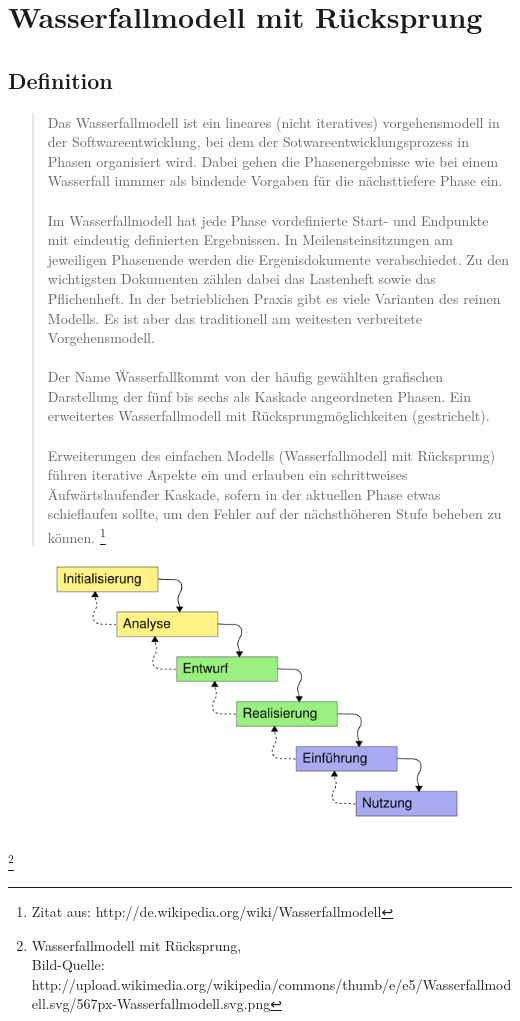 \chapter{Wasserfallmodell mit Rücksprung}
\section{Definition}
\begin{quote}
Das Wasserfallmodell ist ein lineares (nicht iteratives) vorgehensmodell in der Softwareentwicklung, bei dem der
 Sotwareentwicklungsprozess in Phasen organisiert wird. Dabei gehen die Phasenergebnisse wie bei einem Wasserfall immmer
als bindende Vorgaben für die nächsttiefere Phase ein.\ \\ \\
Im Wasserfallmodell hat jede Phase vordefinierte Start- und Endpunkte mit eindeutig definierten Ergebnissen.
In Meilensteinsitzungen am jeweiligen Phasenende werden die Ergenisdokumente verabschiedet. Zu den wichtigsten
Dokumenten zählen dabei das Lastenheft sowie das Pflichenheft. In der betrieblichen Praxis gibt es viele Varianten
des reinen Modells. Es ist aber das traditionell am weitesten verbreitete Vorgehensmodell.\ \\ \\
Der Name \"Wasserfall\" kommt von der häufig gewählten grafischen Darstellung der fünf bis sechs als Kaskade
angeordneten Phasen. Ein erweitertes Wasserfallmodell mit Rücksprungmöglichkeiten (gestrichelt).\ \\ \\
Erweiterungen des einfachen Modells (Wasserfallmodell mit Rücksprung) führen iterative Aspekte ein und erlauben
ein schrittweises \"Aufwärtslaufen\" der Kaskade, sofern in der aktuellen Phase etwas schieflaufen sollte,
um den Fehler auf der nächsthöheren Stufe beheben zu können.
\footnote{Zitat aus:  http://de.wikipedia.org/wiki/Wasserfallmodell}
\end{quote}
\begin{figure}[h]
\centering
\includegraphics[scale=0.35]{567px-Wasserfallmodell.png}
\end{figure}
\footnote{Wasserfallmodell mit Rücksprung, \\ Bild-Quelle: http://upload.wikimedia.org/wikipedia/commons/thumb/e/e5/Wasserfallmodell.svg/567px-Wasserfallmodell.svg.png}
